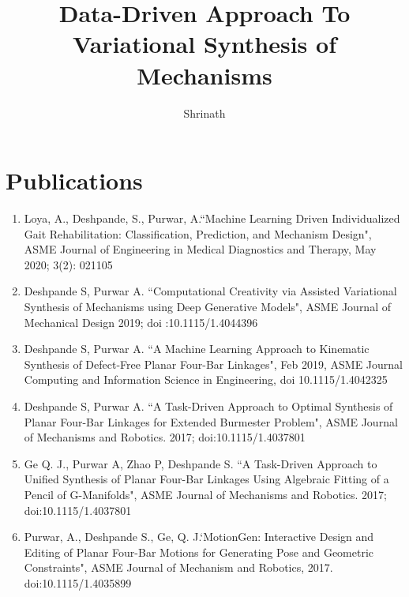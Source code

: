 \documentclass[defaultstyle,12pt]{thesis}
\title{Data-Driven Approach To Variational Synthesis of Mechanisms}
\author{Shrinath}{Deshpande}
\begin{document}
\clearpage

\printacronyms[include-classes=abbrev,name=Abbreviations]

\printacronyms[include-classes=nomencl,name=Nomenclature]

\clearpage
\chapter*{Publications}
{
    \begin{enumerate}
      \item{Loya, A., Deshpande, S., Purwar, A.``Machine Learning Driven Individualized Gait Rehabilitation: Classification, Prediction, and Mechanism Design", ASME Journal of Engineering in Medical Diagnostics and Therapy, May 2020; 3(2): 021105}
      \item{Deshpande S, Purwar A. ``Computational Creativity via Assisted Variational Synthesis of Mechanisms using Deep Generative Models", ASME Journal of Mechanical Design 2019; doi :10.1115/1.4044396}
      \item{Deshpande S, Purwar A. ``A Machine Learning Approach to Kinematic Synthesis of Defect-Free Planar Four-Bar Linkages", Feb 2019, ASME Journal Computing and Information Science in Engineering, doi 10.1115/1.4042325}
      \item{Deshpande S, Purwar A. ``A Task-Driven Approach to Optimal Synthesis of Planar Four-Bar Linkages for Extended Burmester Problem", ASME Journal of Mechanisms and Robotics. 2017; doi:10.1115/1.4037801}
      \item{Ge Q. J., Purwar A, Zhao P, Deshpande S. ``A Task-Driven Approach to Unified Synthesis of Planar Four-Bar Linkages Using Algebraic Fitting of a Pencil of G-Manifolds", ASME Journal of Mechanisms and Robotics. 2017; doi:10.1115/1.4037801}
      \item{Purwar, A., Deshpande S., Ge, Q. J.`MotionGen: Interactive Design and Editing of Planar Four-Bar Motions for Generating Pose and Geometric Constraints", ASME Journal of Mechanism and Robotics, 2017. doi:10.1115/1.4035899}
    \end{enumerate}
}











\appendix
\end{document}
